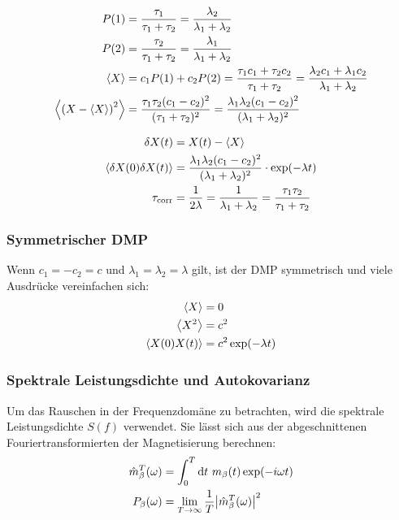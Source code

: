 \documentclass[main.tex]{subfiles}
\begin{document}
\begin{align}
	P(1)                            & = \frac{\tau_1}{\tau_1 + \tau_2} =
	\frac{\lambda_2 }{\lambda_1 +
		\lambda_2}
	\\
	P(2)                            & = \frac{\tau_2}{\tau_1 + \tau_2} =
	\frac{\lambda_1 }{\lambda_1 +
		\lambda_2}
	\\
	\expval{X}                      & = c_1 P(1) + c_2 P(2) = \frac{\tau_1
		c_1 + \tau_2
		c_2}{\tau_1 + \tau_2} = \frac{\lambda_2 c_1 + \lambda_1
		c_2}{\lambda_1 +
		\lambda_2}
	\\
	\expval{\qty(X - \expval{X})^2} & = \frac{\tau_1 \tau_2
		(c_1-c_2)^2}{(\tau_1 + \tau_2)^2} = \frac{\lambda_1 \lambda_2
		(c_1-c_2)^2}{(\lambda_1 + \lambda_2)^2}
\end{align}

\begin{align}
	\delta X(t) & = X(t) - \expval{X}\\
	\expval{\delta X(0)\delta X(t)} &= \frac{\lambda_1 \lambda_2
	(c_1-c_2)^2}{(\lambda_1 + \lambda_2)^2} \cdot \exp(-\lambda t)\\
	\tau_\mathrm{corr} &= \frac{1}{2\lambda} = \frac{1}{\lambda_1 +
		\lambda_2} = \frac{\tau_1 \tau_2}{\tau_1 + \tau_2}
\end{align}

\subsubsection*{Symmetrischer DMP}

Wenn \(c_1=-c_2=c\) und \(\lambda_1 = \lambda_2 = \lambda\) gilt, ist der DMP
symmetrisch und viele Ausdrücke vereinfachen sich:
\begin{align}
	\expval{X}        & = 0                    \\
	\expval{X^2}      & = c^2                  \\
	\expval{X(0)X(t)} & = c^2 \exp(-\lambda t)
\end{align}\cite{matphys}
\subsubsection*{Spektrale Leistungsdichte und Autokovarianz}

Um das Rauschen in der Frequenzdomäne zu betrachten, wird die spektrale
Leistungsdichte \(S(f)\) verwendet. Sie lässt sich aus der abgeschnittenen
Fouriertransformierten der Magnetisierung berechnen:
\begin{align}
	\hat{m}_\beta^T(\omega) & = \int_0^T \mathrm{d} t \ m_\beta(t) \exp(-i \omega
	t)
	\\
	P_{\beta}(\omega)       & = \lim_{T \to \infty} \frac{1}{T}
	\abs{\hat{m}_\beta^T(\omega)}^2
\end{align}
\end{document}
